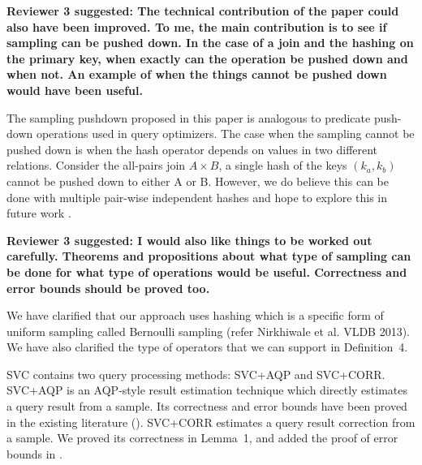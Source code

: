 \vspace{1.5em}

\textbf{Reviewer 3 suggested: The technical contribution of the paper could also have been improved. To me, the main contribution is to see if sampling can be pushed down. In the case of a join and the hashing on the primary key, when exactly can the operation be pushed down and when not. An example of when the things cannot be pushed down would have been useful. }

The sampling pushdown proposed in this paper is analogous to predicate push-down operations used in query optimizers. The case when the sampling cannot be pushed down
is when the hash operator depends on values in two different relations. Consider the all-pairs join $A \times B$, a single hash of the keys $(k_a, k_b)$ cannot be pushed down to either A or B.  However, we do believe this can be done with multiple pair-wise independent hashes  and hope to explore this in future work .

\vspace{1.5em}

\textbf{Reviewer 3 suggested: I would also like things to be worked out carefully. Theorems and propositions about what type of sampling can be done for what type of operations would be useful. Correctness and error bounds should be proved too.}

We have clarified that our approach uses hashing which is a specific form of uniform sampling called Bernoulli sampling (refer Nirkhiwale et al. VLDB 2013). We have also clarified the type of operators that we can support in Definition~4. 

SVC contains two query processing methods:  SVC+AQP and SVC+CORR. SVC+AQP is an AQP-style result estimation technique which directly estimates a query result from a sample. Its correctness and error bounds have been proved in the existing literature (). SVC+CORR estimates a query result correction from a sample. We proved its correctness in Lemma~1, and added the proof of error bounds in . 

